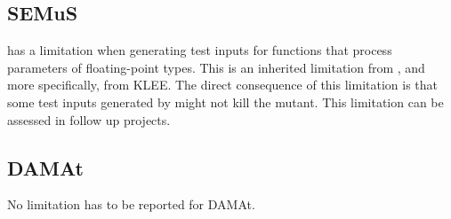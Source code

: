 \subsection{SEMuS}

\SEMUS has a limitation when generating test inputs for functions that process parameters of floating-point types. This is an inherited limitation from \SEMU, and more specifically, from KLEE. The direct consequence of this limitation is that some test inputs generated by \SEMUS might not kill the mutant. This limitation can be assessed in follow up projects.

\subsection{DAMAt}

No limitation has to be reported for DAMAt.
